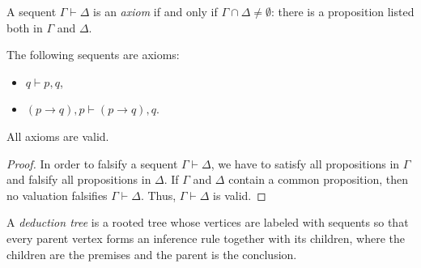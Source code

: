\begin{page}

\begin{dfn}
A sequent $\Gamma \vdash \Delta$ is an \emph{axiom} if and only if $\Gamma \cap \Delta \ne \emptyset$:
there is a proposition listed both in $\Gamma$ and $\Delta$.
\end{dfn}

\end{page}

\begin{page}

\begin{exl}
The following sequents are axioms:
\begin{itemize}
\item $q \vdash p, q$,
\item $(p \to q), p \vdash (p \to q), q$.
\end{itemize}
\end{exl}

\end{page}

\begin{page}

\begin{lem}
\label{lem:AxiomValid}
All axioms are valid.
\end{lem}

\end{page}

\begin{page}

\begin{proof}
In order to falsify a sequent $\Gamma \vdash \Delta$, we have to satisfy all propositions in $\Gamma$ and falsify all propositions in $\Delta$.
If $\Gamma$ and $\Delta$ contain a common proposition, then no valuation falsifies $\Gamma \vdash \Delta$.
Thus, $\Gamma \vdash \Delta$ is valid.
\end{proof}


\end{page}

\begin{page}

\begin{dfn}
\label{dfn:DeductionTree}
A \emph{deduction tree} is a rooted tree whose vertices are labeled with sequents so that
every parent vertex forms an inference rule together with its children, where the children are the premises and the parent is the conclusion.
\end{dfn}

\end{page}

